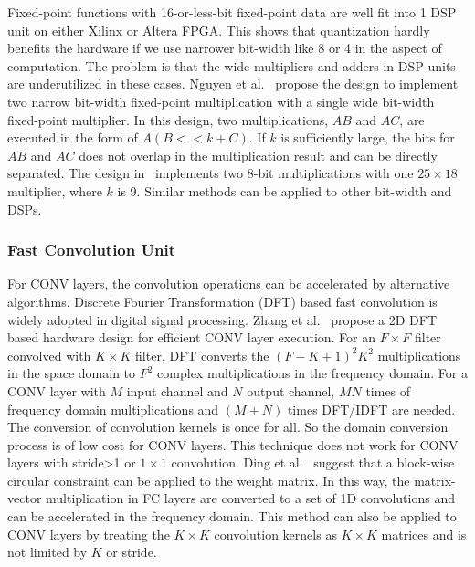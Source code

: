 Fixed-point functions with 16-or-less-bit fixed-point data are well fit into 1 DSP unit on either Xilinx or Altera FPGA. This shows that quantization hardly benefits the hardware if we use narrower bit-width like 8 or 4 in the aspect of computation. The problem is that the wide multipliers and adders in DSP units are underutilized in these cases. Nguyen et al.~\cite{nguyen2017double} propose the design to implement two narrow bit-width fixed-point multiplication with a single wide bit-width fixed-point multiplier. In this design, two multiplications, $AB$ and $AC$, are executed in the form of $A(B<<k+C)$. If $k$ is sufficiently large, the bits for $AB$ and $AC$ does not overlap in the multiplication result and can be directly separated. The design in~\cite{nguyen2017double} implements two 8-bit multiplications with one $25\times 18$ multiplier, where $k$ is 9. Similar methods can be applied to other bit-width and DSPs.




\subsubsection{Fast Convolution Unit}\label{sec:hardware:cu:fcu}
For CONV layers, the convolution operations can be accelerated by alternative algorithms. Discrete Fourier Transformation (DFT) based fast convolution is widely adopted in digital signal processing. Zhang et al.~\cite{zhang2017frequency} propose a 2D DFT based hardware design for efficient CONV layer execution. For an $F\times F$ filter convolved with $K\times K$ filter, DFT converts the $(F-K+1)^2K^2$ multiplications in the space domain to $F^2$ complex multiplications in the frequency domain. For a CONV layer with $M$ input channel and $N$ output channel, $MN$ times of frequency domain multiplications and $(M+N)$ times DFT/IDFT are needed. The conversion of convolution kernels is once for all. So the domain conversion process is of low cost for CONV layers. This technique does not work for CONV layers with stride>1 or $1\times 1$ convolution. Ding et al.~\cite{ding2017c} suggest that a block-wise circular constraint can be applied to the weight matrix. In this way, the matrix-vector multiplication in FC layers are converted to a set of 1D convolutions and can be accelerated in the frequency domain. This method can also be applied to CONV layers by treating the $K\times K$ convolution kernels as $K\times K$ matrices and is not limited by $K$ or stride.

